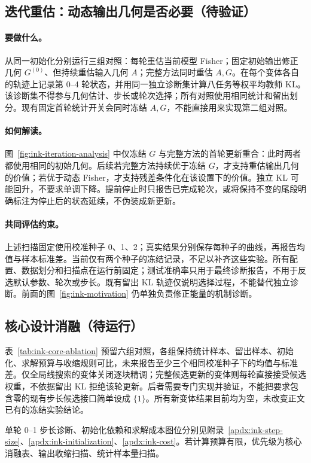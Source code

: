 \FloatBarrier
\subsection{迭代重估：动态输出几何是否必要（待验证）}
\label{sec:ink-iteration-analysis}

\paragraph{要做什么。}
从同一初始化分别运行三组对照：每轮重估当前模型 Fisher；固定初始输出修正几何 $G^{(0)}$、但持续重估输入几何 $A$；完整方法同时重估 $A,G$。在每个变体各自的轨迹上记录第 0--4 轮状态，并用同一独立诊断集计算八任务等权平均教师 KL。该诊断集不得参与几何估计、步长或轮次选择；所有对照使用相同统计和留出划分。现有固定首轮统计开关会同时冻结 $A,G$，不能直接用来实现第二组对照。



\paragraph{如何解读。}
图~\ref{fig:ink-iteration-analysis} 中仅冻结 $G$ 与完整方法的首轮更新重合：此时两者都使用相同的初始几何。后续若完整方法持续优于冻结 $G$，才支持重估输出几何的价值；若优于动态 Fisher，才支持残差条件化在该设置下的价值。独立 KL 可能回升，不要求单调下降。提前停止时只报告已完成轮次，或将保持不变的尾段明确标注为停止后的状态延续，不伪装成新更新。

\paragraph{共同评估约束。}
上述扫描固定使用校准种子 0、1、2；真实结果分别保存每种子的曲线，再报告均值与样本标准差。当前仅有两个种子的冻结记录，不足以补齐这些实验。所有配置、数据划分和扫描点在运行前固定；测试准确率只用于最终诊断报告，不用于反选默认参数、轮次或步长。既有留出 KL 轨迹仅说明选择过程，不能替代独立诊断。前面的图~\ref{fig:ink-motivation} 仍单独负责修正能量的机制诊断。

\FloatBarrier
\subsection{核心设计消融（待运行）}
\label{sec:ink-core-ablation}



表~\ref{tab:ink-core-ablation} 预留六组对照，各组保持统计样本、留出样本、初始化、求解预算与收缩规则可比，未来报告至少三个相同校准种子下的均值与标准差。仅全局线搜索的变体关闭逐块精调；完整候选更新的变体则每轮直接接受候选权重，不依据留出 KL 拒绝该轮更新。后者需要专门实现并验证，不能把要求包含零的现有步长候选接口简单设成 $\{1\}$。所有新变体结果目前均为空，未改变正文已有的冻结实验结论。

单轮 0--1 步长诊断、初始化依赖和求解成本图位分别见附录~\ref{apdx:ink-step-size}、\ref{apdx:ink-initialization}、\ref{apdx:ink-cost}。若计算预算有限，优先级为核心消融表、输出收缩扫描、统计样本量扫描。
\FloatBarrier
